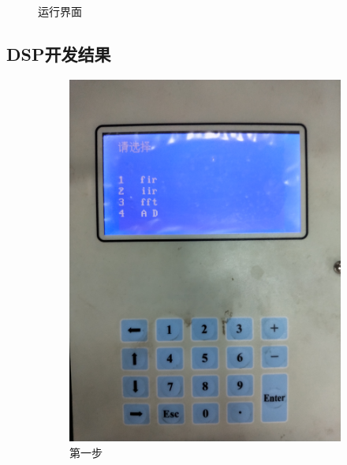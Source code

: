 \documentclass{article}
\newcounter{sub}
\begin{document}
\begin{figure}[htpb]
	\centering
	\caption{运行界面}
	\label{fig:运行界面}
\end{figure}

\subsection{DSP开发结果}%
\label{sub:DSP开发结果}

\begin{figure}[H]
	\centering
	\begin{subfigure}[H]{.3\linewidth}
		\centering
		\includegraphics[width=\linewidth]{step1.jpg}
		\caption{第一步}
		\label{fig:第一步}
	\end{subfigure}
	\quad
	\begin{subfigure}[H]{.3\linewidth}
		\centering

\end{subfigure}
\end{figure}
\end{document}
